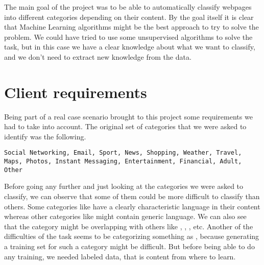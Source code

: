 
The main goal of the project was to be able to automatically classify webpages into different categories depending on their content. 
By the goal itself it is clear that Machine Learning algorithms might be the best approach to try to solve the problem. We could have tried to use some unsupervised algorithms to solve the task,
but in this case we have a clear knowledge about what we want to classify, and we don't need to extract new knowledge from the data.

\section{Client requirements}

Being part of a real case scenario brought to this project some requirements we had to take into account. The original set of categories that we were asked to identify was the following.


\begin{lstlisting}
Social Networking, Email, Sport, News, Shopping, Weather, Travel, Maps, Photos, Instant Messaging, Entertainment, Financial, Adult, Other
\end{lstlisting}

Before going any further and just looking at the categories we were asked to classify, we can observe that some of them could be more difficult to classify than others.
Some categories like  have a clearly characteristic language in their content whereas other categories like  might contain generic language.
We can also see that the category  might be overlapping with others like , , , etc. 
Another of the difficulties of the task seems to be categorizing something as , because generating a training set for such a category might be difficult. 
But before being able to do any training, we needed labeled data, that is content from where to learn.


